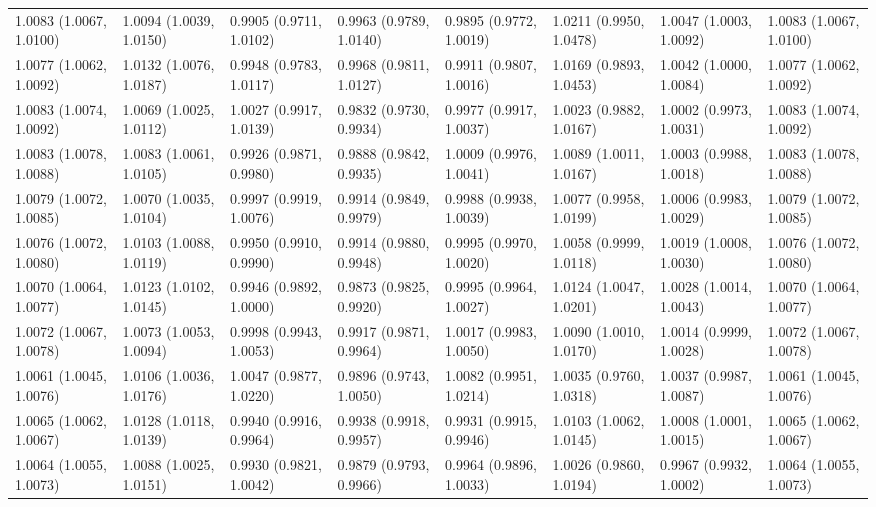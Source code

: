 \begin{table}[ht]
\begin{tabular}{llllllll}
  1.0083 (1.0067, 1.0100) & 1.0094 (1.0039, 1.0150) & 0.9905 (0.9711, 1.0102) & 0.9963 (0.9789, 1.0140) & 0.9895 (0.9772, 1.0019) & 1.0211 (0.9950, 1.0478) & 1.0047 (1.0003, 1.0092) & 1.0083 (1.0067, 1.0100) \\ 
  1.0077 (1.0062, 1.0092) & 1.0132 (1.0076, 1.0187) & 0.9948 (0.9783, 1.0117) & 0.9968 (0.9811, 1.0127) & 0.9911 (0.9807, 1.0016) & 1.0169 (0.9893, 1.0453) & 1.0042 (1.0000, 1.0084) & 1.0077 (1.0062, 1.0092) \\ 
  1.0083 (1.0074, 1.0092) & 1.0069 (1.0025, 1.0112) & 1.0027 (0.9917, 1.0139) & 0.9832 (0.9730, 0.9934) & 0.9977 (0.9917, 1.0037) & 1.0023 (0.9882, 1.0167) & 1.0002 (0.9973, 1.0031) & 1.0083 (1.0074, 1.0092) \\ 
  1.0083 (1.0078, 1.0088) & 1.0083 (1.0061, 1.0105) & 0.9926 (0.9871, 0.9980) & 0.9888 (0.9842, 0.9935) & 1.0009 (0.9976, 1.0041) & 1.0089 (1.0011, 1.0167) & 1.0003 (0.9988, 1.0018) & 1.0083 (1.0078, 1.0088) \\ 
  1.0079 (1.0072, 1.0085) & 1.0070 (1.0035, 1.0104) & 0.9997 (0.9919, 1.0076) & 0.9914 (0.9849, 0.9979) & 0.9988 (0.9938, 1.0039) & 1.0077 (0.9958, 1.0199) & 1.0006 (0.9983, 1.0029) & 1.0079 (1.0072, 1.0085) \\ 
  1.0076 (1.0072, 1.0080) & 1.0103 (1.0088, 1.0119) & 0.9950 (0.9910, 0.9990) & 0.9914 (0.9880, 0.9948) & 0.9995 (0.9970, 1.0020) & 1.0058 (0.9999, 1.0118) & 1.0019 (1.0008, 1.0030) & 1.0076 (1.0072, 1.0080) \\ 
  1.0070 (1.0064, 1.0077) & 1.0123 (1.0102, 1.0145) & 0.9946 (0.9892, 1.0000) & 0.9873 (0.9825, 0.9920) & 0.9995 (0.9964, 1.0027) & 1.0124 (1.0047, 1.0201) & 1.0028 (1.0014, 1.0043) & 1.0070 (1.0064, 1.0077) \\ 
  1.0072 (1.0067, 1.0078) & 1.0073 (1.0053, 1.0094) & 0.9998 (0.9943, 1.0053) & 0.9917 (0.9871, 0.9964) & 1.0017 (0.9983, 1.0050) & 1.0090 (1.0010, 1.0170) & 1.0014 (0.9999, 1.0028) & 1.0072 (1.0067, 1.0078) \\ 
  1.0061 (1.0045, 1.0076) & 1.0106 (1.0036, 1.0176) & 1.0047 (0.9877, 1.0220) & 0.9896 (0.9743, 1.0050) & 1.0082 (0.9951, 1.0214) & 1.0035 (0.9760, 1.0318) & 1.0037 (0.9987, 1.0087) & 1.0061 (1.0045, 1.0076) \\ 
  1.0065 (1.0062, 1.0067) & 1.0128 (1.0118, 1.0139) & 0.9940 (0.9916, 0.9964) & 0.9938 (0.9918, 0.9957) & 0.9931 (0.9915, 0.9946) & 1.0103 (1.0062, 1.0145) & 1.0008 (1.0001, 1.0015) & 1.0065 (1.0062, 1.0067) \\ 
  1.0064 (1.0055, 1.0073) & 1.0088 (1.0025, 1.0151) & 0.9930 (0.9821, 1.0042) & 0.9879 (0.9793, 0.9966) & 0.9964 (0.9896, 1.0033) & 1.0026 (0.9860, 1.0194) & 0.9967 (0.9932, 1.0002) & 1.0064 (1.0055, 1.0073) \\ 

\end{tabular}
\end{table}
